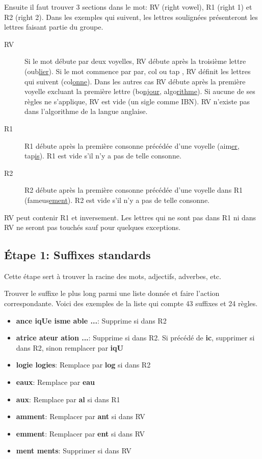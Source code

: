Ensuite il faut trouver 3 sections dans le mot: RV (right vowel), R1 (right 1) et R2 (right 2). Dans les exemples qui suivent, les lettres soulignées présenteront les lettres faisant partie du groupe.

\begin{description}
  \item[RV]
  
  Si le mot débute par deux voyelles, RV débute après la troisième lettre (oub\underline{lier}). Si le mot commence par \og par, col ou tap \fg{}, RV définit les lettres qui suivent (col\underline{onne}). Dans les autres cas RV débute après la première voyelle excluant la première lettre (bo\underline{njour}, algo\underline{rithme}).  Si aucune de ses règles ne s'applique, RV est vide (un sigle comme IBN). RV n'existe pas dans l'algorithme de la langue anglaise.
  
  \item[R1]
  
  R1 débute après la première consonne précédée d'une voyelle (aim\underline{er}, tap\underline{is}). R1 est vide s'il n'y a pas de telle consonne.
  
  \item[R2]
  
  R2 débute après la première consonne précédée d'une voyelle dans R1 (fameus\underline{ement}). R2 est vide s'il n'y a pas de telle consonne.
\end{description}

RV peut contenir R1 et inversement. Les lettres qui ne sont pas dans R1 ni dans RV ne seront pas touchés sauf pour quelques exceptions.

\subsection*{Étape 1: Suffixes standards}

Cette étape sert à trouver la racine des mots, adjectifs, adverbes, etc.

Trouver le suffixe le plus long parmi une liste donnée et faire l'action correspondante. Voici des exemples de la liste qui compte 43 suffixes et 24 règles.

\begin{itemize}
  \item \textbf{ance iqUe isme able ...}: Supprime si dans R2
  \item \textbf{atrice ateur ation ...}: Supprime si dans R2. Si précédé de \textbf{ic}, supprimer si dans R2, sinon remplacer par \textbf{iqU}
  \item \textbf{logie logies}: Remplace par \textbf{log} si dans R2
  \item \textbf{eaux}: Remplace par \textbf{eau}
  \item \textbf{aux}: Remplace par \textbf{al} si dans R1
  \item \textbf{amment}: Remplacer par \textbf{ant} si dans RV
  \item \textbf{emment}: Remplacer par \textbf{ent} si dans RV
  \item \textbf{ment ments}: Supprimer si dans RV
\end{itemize}

